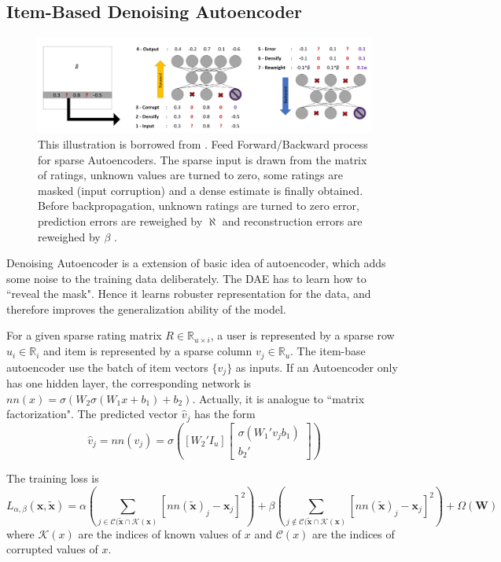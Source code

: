 \documentclass{article}
\begin{document}
\subsection{Item-Based Denoising Autoencoder}
\begin{figure}[!h]
	\centering
	\includegraphics[width=\textwidth]{figures/fig1}
	\caption{This illustration is borrowed from \cite{}. Feed Forward/Backward process for sparse Autoencoders. The sparse input is drawn from the matrix of ratings, unknown values are turned to zero, some ratings are masked (input corruption) and a dense estimate is finally obtained. Before backpropagation, unknown ratings are turned to zero error, prediction errors are reweighed by $\aleph$ and reconstruction errors are reweighed by $\beta$ .}
\end{figure}

Denoising Autoencoder is a extension of basic idea of autoencoder, which adds some noise to the training data deliberately. The DAE has to learn how to ``reveal the mask". Hence it learns robuster representation for the data, and therefore improves the generalization ability of the model.

For a given sparse rating matrix $R \in \mathbb R_{u\times i}$, a user is represented by a sparse row $u_i\in \mathbb R_i$ and item is represented by a sparse column $v_j \in \mathbb R_u$. The item-base autoencoder use the batch of item vectors $\{v_j\}$ as inputs. If an Autoencoder only has one hidden layer, the corresponding network is $nn(x) = \sigma (W_2 \sigma(W_1 x + b_1) + b_2 )$.
Actually, it is analogue to ``matrix factorization". The predicted vector $\hat v_j$ has the form
\[\hat v_j = nn(v_j) = \sigma\left([W_2'I_u]\left[\begin{matrix}
	\sigma(W_1'v_jb_1)\\
	b_2'
\end{matrix} \right]\right)\]

The training loss is 
\[L_{\alpha, \beta}(\bm x, \tilde{\bm x}) = \alpha\left( \sum_{j\in \mathcal C(\tilde{\bm x}\cap\mathcal K(\bm x)}[nn(\tilde{\bm x})_j - \bm x_j]^2 \right) + \beta \left( \sum_{j\notin \mathcal C(\tilde{\bm x}\cap\mathcal K(\bm x)}[nn(\tilde{\bm x})_j - \bm x_j]^2 \right) + \Omega(\bm W)\]
where $\mathcal K(x)$ are the indices of known values of $x$ and $\mathcal C(x)$ are the indices of corrupted values of $x$.
\end{document}
